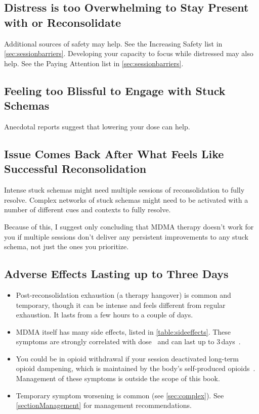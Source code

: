 \documentclass[11pt,oneside]{book}
\let\cite\parencite
\begin{document}
\subsection{Distress is too Overwhelming to Stay Present with or Reconsolidate}
Additional sources of safety may help. See the Increasing Safety list in \cref{sec:sessionbarriers}. Developing your capacity to focus while distressed may also help. See the Paying Attention list in \cref{sec:sessionbarriers}.

\subsection{Feeling too Blissful to Engage with Stuck Schemas}
Anecdotal reports suggest that lowering your dose can help.

\subsection*{Issue Comes Back After What Feels Like Successful Reconsolidation}
Intense stuck schemas might need multiple sessions of reconsolidation to fully resolve. Complex networks of stuck schemas might need to be activated with a number of different cues and contexts to fully resolve.

Because of this, I suggest only concluding that MDMA therapy doesn't work for you if multiple sessions don't deliver any persistent improvements to any stuck schema, not just the ones you prioritize.

\subsection{Adverse Effects Lasting up to Three Days}
\begin{itemize}
    \item Post-reconsolidation exhaustion (a therapy hangover) is common and temporary, though it can be intense and feels different from regular exhaustion. It lasts from a few hours to a couple of days.
    \item MDMA itself has many side effects, listed in \cref{table:sideeffects}. These symptoms are strongly correlated with dose~\cite{studerusResponse} and can last up to 3\,days~\cite{liechtiGender}.
    \item You could be in opioid withdrawal if your session deactivated long-term opioid dampening, which is maintained by the body's self-produced opioids~\cite{laniusNeurobiology}. Management of these symptoms is outside the scope of this book.
    \item Temporary symptom worsening is common (see \cref{sec:complex}). See \cref{sectionManagement} for management recommendations.
\end{itemize}
\end{document}
